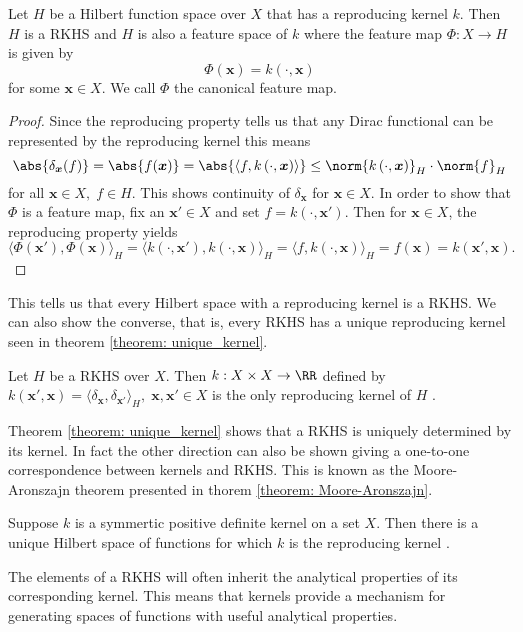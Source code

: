 \begin{lem}[] \label{lem: RKHS_rk_k}
    Let $H$ be a Hilbert function space over $X$ that has a reproducing kernel $k$. Then $H$ is a RKHS and $H$ is also a feature space of $k$ where the feature map $\Phi : X \to H$ is given by
    \[
        \Phi (\bm{x}) = k \left( \cdot , \bm{x}  \right)
    \]
    for some $\bm{x} \in X$. We call $\Phi$ the canonical feature map.
\end{lem}

\begin{proof}
    Since the reproducing property tells us that any Dirac functional can be represented by the reproducing kernel this means
    \[
        \abs{\delta_{\bm{x}} (f)} = \abs{f(\bm{x})} = \abs{\langle f , k \left( \cdot, \bm{x} \right) \rangle} \leq \norm{k \left( \cdot, \bm{x} \right)}_H \cdot \norm{f}_H
    \]
    for all $\bm{x} \in X, \; f \in H$. This shows continuity of $\delta_{\bm{x}}$ for $\bm{x} \in X$. In order to show that $\Phi$ is a feature map, fix an $\bm{x}' \in X$ and set $f = k \left( \cdot, \bm{x}' \right)$. Then for $\bm{x} \in X$, the reproducing property yields
    \[
        \langle \Phi (\bm{x}') , \Phi (\bm{x}) \rangle_H = \langle k \left( \cdot, \bm{x}' \right) , k \left( \cdot, \bm{x} \right) \rangle_H = \langle f , k \left( \cdot, \bm{x} \right) \rangle_H = f(\bm{x}) = k \left( \bm{x}', \bm{x} \right).
    \]
\end{proof}

This tells us that every Hilbert space with a reproducing kernel is a RKHS. We can also show the converse, that is, every RKHS has a unique reproducing kernel seen in theorem \ref{theorem: unique_kernel}.

\begin{thm} \label{theorem: unique_kernel}
    Let $H$ be a RKHS over $X$. Then $k: X \times X \to \RR$ defined by $k \left( \bm{x}', \bm{x} \right) = \langle \delta_{\bm{x}} , \delta_{\bm{x}'} \rangle_H, \; \bm{x} , \bm{x}' \in X$ is the only reproducing kernel of $H$ \cite{SteinwartIngo2008SVMb}.
\end{thm}

Theorem \ref{theorem: unique_kernel} shows that a RKHS is uniquely determined by its kernel. In fact the other direction can also be shown giving a one-to-one correspondence between kernels and RKHS. This is known as the Moore-Aronszajn theorem presented in thorem \ref{theorem: Moore-Aronszajn}.

\begin{thm} \label{theorem: Moore-Aronszajn}
    Suppose $k$ is a symmertic positive definite kernel on a set $X$. Then there is a unique Hilbert space of functions for which $k$ is the reproducing kernel \cite{BerlinetAlain2003RKHS}.
\end{thm}

The elements of a RKHS will often inherit the analytical properties of its corresponding kernel. This means that kernels provide a mechanism for generating spaces of functions with useful analytical properties.